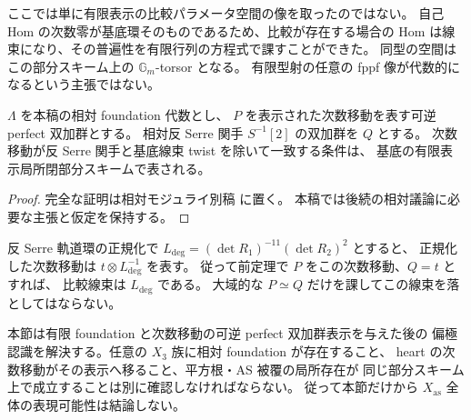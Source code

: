 \begin{remark}
ここでは単に有限表示の比較パラメータ空間の像を取ったのではない。
自己 Hom の次数零が基底環そのものであるため、比較が存在する場合の
Hom は線束になり、その普遍性を有限行列の方程式で課すことができた。
同型の空間はこの部分スキーム上の $\mathbb G_m$-torsor となる。
有限型射の任意の fppf 像が代数的になるという主張ではない。
\end{remark}

\begin{corollary}
\label{cor:foundation-antiserre-comparison-locus}
$\Lambda$ を本稿の相対 foundation 代数とし、
$P$ を表示された次数移動を表す可逆 perfect 双加群とする。
相対反 Serre 関手 $S^{-1}[2]$ の双加群を $Q$ とする。
次数移動が反 Serre 関手と基底線束 twist を除いて一致する条件は、
基底の有限表示局所閉部分スキームで表される。
\end{corollary}
\begin{proof}
完全な証明は相対モジュライ別稿 \cite[有限 foundation 上の偏極認識]{QuadricModuli2026} に置く。
本稿では後続の相対議論に必要な主張と仮定を保持する。
\end{proof}

\begin{remark}[次数の正規化と適用範囲]
反 Serre 軌道環の正規化で
$L_{\mathrm{deg}}=(\det R_1)^{-11}(\det R_2)^2$ とすると、
正規化した次数移動は $t\otimes L_{\mathrm{deg}}^{-1}$ を表す。
従って前定理で $P$ をこの次数移動、$Q=t$ とすれば、
比較線束は $L_{\mathrm{deg}}$ である。
大域的な $P\simeq Q$ だけを課してこの線束を落としてはならない。

本節は有限 foundation と次数移動の可逆 perfect 双加群表示を与えた後の
偏極認識を解決する。任意の $X_3$ 族に相対 foundation が存在すること、
heart の次数移動がその表示へ移ること、平方根・AS 被覆の局所存在が
同じ部分スキーム上で成立することは別に確認しなければならない。
従って本節だけから $X_{\mathrm{as}}$ 全体の表現可能性は結論しない。
\end{remark}
